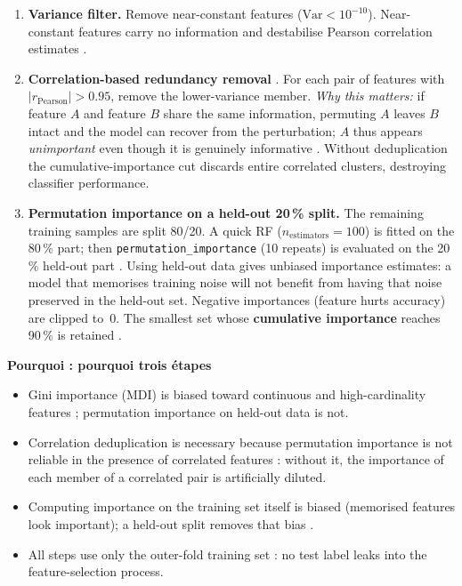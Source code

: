 \documentclass[11pt,a4paper]{article}
\newenvironment{whybox}[1]{%
    \begin{shaded*}\noindent\textbf{Pourquoi : #1}\par\vspace{0.3em}}
    {\end{shaded*}}
\renewenvironment{shaded*}
    {\definecolor{shadecolor}{named}{whyboxbg}\begin{shaded}}
    {\end{shaded}}
\begin{document}
\begin{enumerate}[itemsep=0.15em,topsep=0.2em]
    \item \textbf{Variance filter.}  Remove near-constant features
          ($\mathrm{Var} < 10^{-10}$).  Near-constant features carry
          no information and destabilise Pearson correlation estimates
          \cite{guyon2003fs}.

    \item \textbf{Correlation-based redundancy removal}
          \cite{yu2004relevance,hall1999fs}.  For each pair of features
          with $|r_\text{Pearson}| > 0.95$, remove the lower-variance
          member.  \emph{Why this matters:} if feature $A$ and feature
          $B$ share the same information, permuting $A$ leaves $B$
          intact and the model can recover from the perturbation; $A$
          thus appears \emph{unimportant} even though it is genuinely
          informative \cite{strobl2007bias}.  Without deduplication the
          cumulative-importance cut discards entire correlated clusters,
          destroying classifier performance.

    \item \textbf{Permutation importance on a held-out 20\,\% split.}
          The remaining training samples are split 80/20.  A quick RF
          ($n_\text{estimators}=100$) is fitted on the 80\,\% part; then
          \verb|permutation_importance| (10 repeats) is evaluated on the
          20\,\% held-out part \cite{breiman2001randomforests,
          strobl2007bias}.  Using held-out data gives unbiased importance
          estimates: a model that memorises training noise will not benefit
          from having that noise preserved in the held-out set.  Negative
          importances (feature hurts accuracy) are clipped to~0.  The
          smallest set whose \textbf{cumulative importance} reaches
          90\,\% is retained \cite{guyon2003fs}.
\end{enumerate}

\begin{whybox}{pourquoi trois étapes}
\begin{itemize}[itemsep=0.1em,topsep=0.2em]
\item Gini importance (MDI) is biased toward continuous and
      high-cardinality features \cite{strobl2007bias}; permutation
      importance on held-out data is not.
\item Correlation deduplication is necessary because permutation
      importance is not reliable in the presence of correlated features
      \cite{strobl2007bias,yu2004relevance}: without it, the importance
      of each member of a correlated pair is artificially diluted.
\item Computing importance on the training set itself is biased
      (memorised features look important); a held-out split removes that
      bias \cite{breiman2001randomforests,ambroise2002selection}.
\item All steps use only the outer-fold training set
      \cite{ambroise2002selection}: no test label leaks into the
      feature-selection process.
\end{itemize}
\end{whybox}
\end{document}
